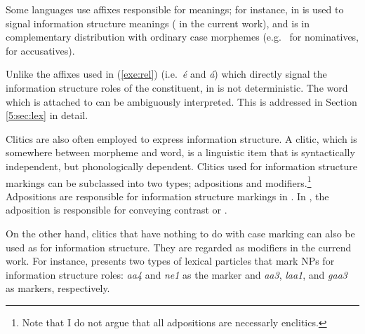 \noindent Some languages use affixes responsible for  meanings;
for instance, \nun in  is used to signal information structure
meanings ( in the current work), and is in
complementary distribution with ordinary case morphemes (e.g.\ \ika
for nominatives, \lul for accusatives).






\noindent Unlike the  affixes used in (\ref{exe:rel})
(i.e.\ \textit{{\'e}} and \textit{{\'a}}) which directly signal the
information structure roles of the constituent, \nun in 
is not deterministic. The word which \nun is attached to can be
ambiguously interpreted. This is addressed in Section \ref{5:sec:lex} in
detail.




Clitics are also often employed to express information structure. A
clitic, which is somewhere between morpheme and word, is a linguistic
item that is syntactically independent, but phonologically dependent.
Clitics used for information structure markings can be subclassed into
two types; adpositions and modifiers.\footnote{Note that I do not argue that all adpositions are necessarly enclitics.} 
Adpositions are responsible for
information structure markings in . In
, the adposition \wa is responsible for conveying
contrast or .






\noindent On the other hand, clitics that have nothing to do with case
marking can also be used as  for information
structure. They are regarded as modifiers in the currend work. For
instance, \citet{man:07} presents two types of  lexical
particles that mark NPs for information structure roles: \textit{aa4}
and \textit{ne1} as the  marker and \textit{aa3}, \textit{laa1},
and \textit{gaa3} as  markers, respectively.



